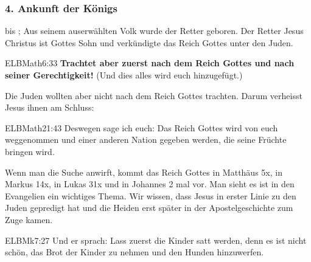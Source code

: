 \documentclass{mybib}
\begin{document}
    \subsubsection{4. Ankunft der Königs}
     bis ; Aus seinem auserwählten Volk wurde der Retter geboren. Der Retter Jesus Christus ist Gottes Sohn und verkündigte das Reich Gottes unter den Juden.
    \begin{bibelbox}{ELB}{Math}{6:33}
        \textbf{Trachtet aber zuerst nach dem Reich Gottes und nach seiner Gerechtigkeit!} (Und dies alles wird euch hinzugefügt.)
    \end{bibelbox}
    Die Juden wollten aber nicht nach dem Reich Gottes trachten. Darum verheisst Jesus ihnen am Schluss:
    \begin{bibelbox}{ELB}{Math}{21:43}
        Deswegen sage ich euch: Das Reich Gottes wird von euch weggenommen und einer anderen Nation gegeben werden, die seine Früchte bringen wird.
    \end{bibelbox}
    Wenn man die Suche anwirft, kommt das Reich Gottes in Matthäus 5x, in Markus 14x, in Lukas 31x und in Johannes 2 mal vor. Man sieht es ist in den Evangelien ein wichtiges Thema. Wir wissen, dass Jesus in erster Linie zu den Juden gepredigt hat und die Heiden erst später in der Apostelgeschichte zum Zuge kamen.
    \begin{bibelbox}{ELB}{Mk}{7:27}
        Und er sprach: \flqq Lass zuerst die Kinder satt werden, denn es ist nicht schön, das Brot der Kinder zu nehmen und den Hunden hinzuwerfen.\frqq{}
    \end{bibelbox}
\end{document}
